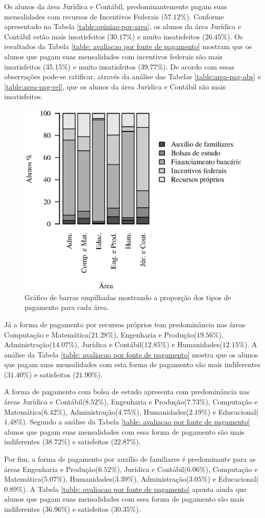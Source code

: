 \documentclass[10pt,a4paper,oneside]{article}
\newcommand{\adm}{Administração\xspace}
\newcommand{\comp}{Computação e Matemática\xspace}
\newcommand{\edu}{Educacional\xspace}
\newcommand{\eng}{Engenharia e Produção\xspace}
\newcommand{\hum}{Humanidades\xspace}
\newcommand{\jur}{Jurídica e Contábil\xspace}
\begin{document}
Os alunos da área \jur, predominantemente pagam suas mensalidades com recursos de Incentivos Federais ($57.12\%$). Conforme apresentado na Tabela \ref{table:opiniao-por-area}, os alunos da área 
\jur estão mais insatisfeitos ($30.17\%$) e muito insatisfeitos ($26.45\%$). Os resultados da Tabela \ref{table: avaliacao por fonte de pagamento} mostram que os alunos que pagam suas mensalidades com incentivos federais são 
mais insatisfeitos (35.15\%) e muito insatisfeitos ($39.77\%$). De acordo com essas observações pode-se ratificar, através da análise das Tabelas \ref{table:area-pag-abs} e \ref{table:area-pag-rel}, que 
os alunos da área \jur são mais insatisfeitos.

\begin{figure}[ht]
	\centering
	\includegraphics[]{plots/stacked100_pagamento_por_area.eps}
	\caption{Gráfico de barras empilhadas mostrando a proporção dos tipos de pagamento para cada área.}
	\label{fig:q20b}
\end{figure}

Já a forma de pagamento por recursos próprios tem predominância nas áreas \comp ($21.28\%$), \eng ($19.56\%$), \adm ($14.07\%$), \jur($12.85\%$) e \hum ($12.15\%$). A análise da Tabela \ref{table: avaliacao por fonte de pagamento} mostra que os alunos que pagam suas mensalidades com esta forma de pagamento são mais indiferentes ($31.40\%$) e satisfeitos ($21.90\%$). 

A forma de pagamento com bolsa de estudo apresenta com predominância nas áreas \jur ($8.52\%$), \eng ($7.73\%$), \comp ($6.42\%$), \adm ($4.75\%$), \hum ($2.19\%$) e \edu($1.48\%$). Segundo a análise da Tabela \ref{table: avaliacao por fonte de pagamento} alunos que pagam suas mensalidades com essa forma de pagamento 
são mais indiferentes ($38.72\%$) e satisfeitos ($22.87\%$).

Por fim, a forma de pagamento por auxílio de familiares é predominante para as áreas \eng($6.52\%$), \jur ($6.06\%$), \comp ($5.07\%$), \hum($3.39\%$), \adm ($3.05\%$) e \edu ($0.89\%$). A Tabela \ref{table: avaliacao por fonte de pagamento} aponta ainda que alunos que pagam suas mensalidades com essa forma de pagamento são mais indiferentes ($36.96\%$) e satisfeitos ($30.35\%$).
\end{document}
